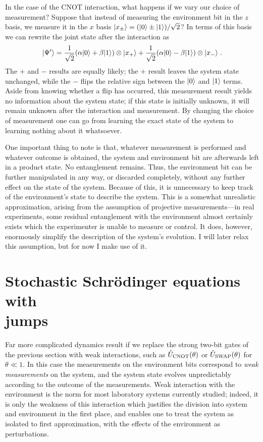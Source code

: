In the case of the CNOT interaction, what happens if we vary our choice of
measurement?  Suppose that instead of measuring the environment bit in
the $z$ basis, we measure it in the $x$ basis
${| x_\pm \rangle} = ({| 0 \rangle} \pm {| 1 \rangle})/\sqrt{2}$?  In terms of this basis we can
rewrite the joint state after the interaction as
\begin{equation}
{| \Psi' \rangle} = {1\over\sqrt2} (\alpha{| 0 \rangle} + \beta{| 1 \rangle})\otimes{| x_+ \rangle}
  + {1\over\sqrt2} (\alpha{| 0 \rangle} - \beta{| 1 \rangle})\otimes{| x_- \rangle} \;.
\end{equation}
The $+$ and $-$ results are equally likely; the $+$ result leaves the
system state unchanged, while the $-$ flips the relative sign between the
${| 0 \rangle}$ and ${| 1 \rangle}$ terms.  Aside from knowing whether a flip has occurred,
this measurement result yields no information about the system state;
if this state is initially unknown, it will remain unknown after the
interaction and measurement.  By changing the choice of measurement one
can go from learning the exact state of the system to learning nothing
about it whatsoever.

One important thing to note is that, whatever measurement is performed and
whatever outcome is obtained, the system and environment bit are afterwards
left in a product state.  No entanglement remains.  Thus, the environment
bit can be further manipulated in any way, or discarded completely, without
any further effect on the state of the system.  Because of this, it is
unnecessary to keep track of the environment's state to describe
the system.  This is a somewhat unrealistic approximation,
arising from the assumption of projective measurements---in
real experiments, some residual entanglement with the environment almost
certainly exists which the experimenter is unable to measure or control.  It
does, however, enormously simplify the description of the system's evolution.
I will later relax this assumption, but for now I make use of it.


\section{Stochastic Schr\"odinger equations with \\ jumps}

Far more complicated dynamics result if we replace the strong two-bit
gates of the previous section with weak interactions, such as
${\hat U}_{\rm CNOT}(\theta)$ or ${\hat U}_{\rm SWAP}(\theta)$ for $\theta \ll 1$.
In this case the measurements on the environment bits correspond to
{\it weak measurements} on the system, and the system state evolves
unpredictably according to the outcome of the measurements.
Weak interaction with the environment is the norm for most laboratory
systems currently studied; indeed, it is only the weakness of this
interaction which justifies the division into system and environment
in the first place, and enables one to treat the system as isolated to
first approximation, with the effects of the environment as
perturbations.

